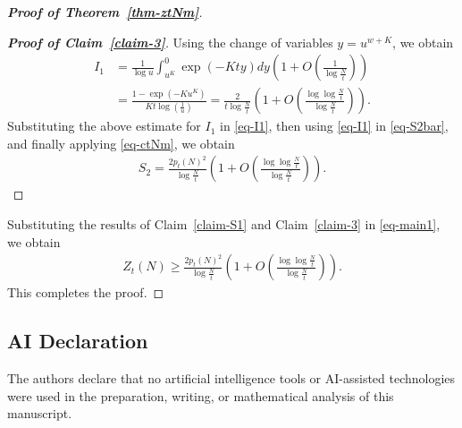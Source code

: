 \documentclass[11pt]{amsart}
\theoremstyle{plain}
\numberwithin{equation}{section}
\begin{document}
\begin{proof}[\textbf{\boldmath Proof of Theorem~\ref{thm-ztNm}}]
\begin{proof}[\textbf{\boldmath Proof of Claim~\ref{claim-3}}]
			Using the change of variables $y = u^{w+K}$, we obtain
			\begin{align*}
				I_1&=\frac{1}{\log u}\int_{u^{K}}^{0}\exp\left(-Kty\right)dy\left(1+O\left(\frac{1}{\log \frac{N}{t}}\right)\right) \\
				&=\frac{1-\exp\left(-Ku^{K}\right)}{Kt\log\left(\frac{1}{u}\right)}=\frac{2}{t\log \frac{N}{t}}\left(1+O\left(\frac{\log \log \frac{N}{t}}{\log \frac{N}{t}}\right)\right).
			\end{align*}
			Substituting the above estimate for $I_1$ in \eqref{eq-I1}, then using \eqref{eq-I1} in \eqref{eq-S2bar}, and finally applying \eqref{eq-ctNm}, we obtain
			\begin{align*}
				S_2= \frac{2p_t(N)^{2}}{\log \frac{N}{t}}\left(1+O\left(\frac{\log \log \frac{N}{t}}{\log \frac{N}{t}}\right)\right).   
			\end{align*}
		\end{proof}
		Substituting the results of Claim~\ref{claim-S1} and Claim~\ref{claim-3} in \eqref{eq-main1}, we obtain
		\begin{align*}
			Z_t(N)\ge \frac{2p_t(N)^{2}}{\log \frac{N}{t}}\left(1+O\left(\frac{\log \log \frac{N}{t}}{\log \frac{N}{t}}\right)\right).   
		\end{align*}
		This completes the proof.
		
	\end{proof}
	\subsection*{AI Declaration}
	
	The authors declare that no artificial intelligence tools or AI-assisted technologies were
	used in the preparation, writing, or mathematical analysis of this manuscript.
	
\end{document}
